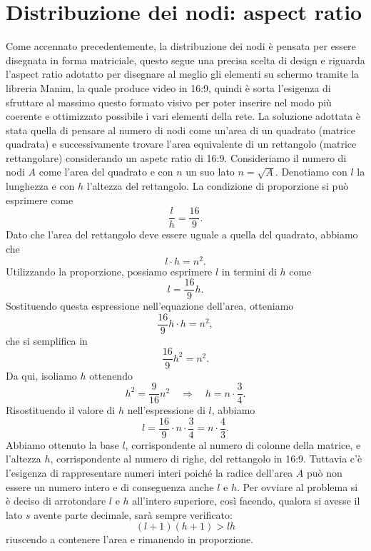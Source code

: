 \documentclass[binding=0.6cm]{sapthesis}
\begin{document}
\section{Distribuzione dei nodi: aspect ratio}
\label{sec:aspect_ratio}
Come accennato precedentemente, la distribuzione dei nodi è pensata per essere disegnata in forma matriciale, questo segue una precisa scelta di design e riguarda
l'aspect ratio adotatto per disegnare al meglio gli elementi su schermo tramite la libreria Manim, la quale produce video in 16:9, quindi è sorta l'esigenza
di sfruttare al massimo questo formato visivo per poter inserire nel modo più coerente e ottimizzato possibile i vari elementi della rete.
La soluzione adottata è stata quella di pensare al numero di nodi come un'area di un quadrato (matrice quadrata) e successivamente trovare l'area equivalente 
di un rettangolo (matrice rettangolare) considerando un
aspetc ratio di 16:9. Consideriamo il numero di nodi \(A\) come l'area del quadrato e con \(n\) un suo lato \(n = \sqrt{A}\).
Denotiamo con $l$ la lunghezza e con $h$ l'altezza del rettangolo. La condizione di proporzione si può esprimere come
\[
\frac{l}{h} = \frac{16}{9}.
\]
Dato che l'area del rettangolo deve essere uguale a quella del quadrato, abbiamo che
\[
l \cdot h = n^2.
\]
Utilizzando la proporzione, possiamo esprimere $l$ in termini di $h$ come
\[
l = \frac{16}{9}h.
\]
Sostituendo questa espressione nell'equazione dell'area, otteniamo
\[
\frac{16}{9}h \cdot h = n^2,
\]
che si semplifica in
\[
\frac{16}{9}h^2 = n^2.
\]
Da qui, isoliamo $h$ ottenendo
\[
h^2 = \frac{9}{16}n^2 \quad \Longrightarrow \quad h = n \cdot \frac{3}{4}.
\]
Risostituendo il valore di $h$ nell'espressione di $l$, abbiamo
\[
l = \frac{16}{9} \cdot n \cdot \frac{3}{4} = n \cdot \frac{4}{3}.
\]
Abbiamo ottenuto la base \(l\), corrispondente al numero di colonne della matrice, e l'altezza \(h\), corrispondente al numero
di righe, del rettangolo in 16:9. Tuttavia c'è l'esigenza di rappresentare numeri interi poiché la radice dell'area \(A\) può non essere un numero intero e di conseguenza anche \(l\) e \(h\).
Per ovviare al problema si è deciso di arrotondare \(l\) e \(h\) all'intero superiore, così facendo, qualora si avesse
il lato \(s\) avente parte decimale, sarà sempre verificato:
\begin{equation}
    (l+1)(h+1)>lh
\end{equation}
riuscendo a contenere l'area e rimanendo in proporzione.
\end{document}
